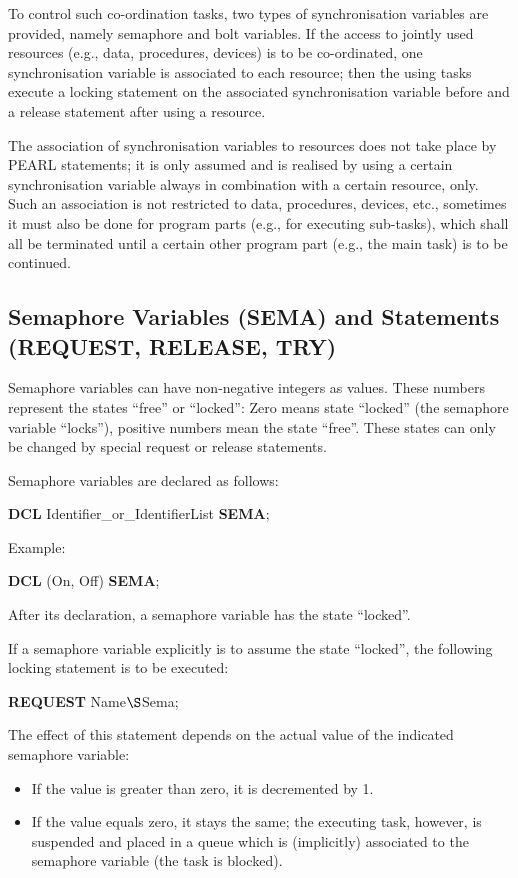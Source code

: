 To control such co-ordination tasks, two types of synchronisation
variables are provided, namely semaphore and bolt variables. If the
access to jointly used resources (e.g., data, procedures, devices) is to
be co-ordinated, one synchronisation variable is associated to each
resource; then the using tasks execute a locking statement on the
associated synchronisation variable before and a release statement
after using a resource.

The association of synchronisation variables to resources does not take
place by PEARL statements; it is only assumed and is realised by using a
certain synchronisation variable always in combination with a certain
resource, only. Such an association is not restricted to data,
procedures, devices, etc., sometimes it must also be done for program
parts (e.g., for executing sub-tasks), which shall all be
terminated until a certain other program part (e.g., the main task) is to be
continued.

\subsection{Semaphore Variables (SEMA) and Statements (REQUEST,
RELEASE, TRY)} %
\label{sec_semaphores}


Semaphore variables can have non-negative integers as values. These
numbers represent the states ``free'' or ``locked'': Zero means state
``locked'' (the semaphore variable ``locks''), positive numbers mean the
state ``free''.  These states can only be changed by special request or
release statements.

Semaphore variables are declared as follows:

{\bf DCL} Identifier\_or\_IdentifierList {\bf SEMA};

Example:

{\bf DCL} (On, Off) {\bf SEMA};

After its declaration, a semaphore variable has the state ``locked''.

If a semaphore variable explicitly is to assume the state ``locked'',
the following locking statement is to be executed:

{\bf REQUEST} Name$\S $Sema;

The effect of this statement depends on the actual value of the
indicated semaphore variable:
\begin{itemize}
\item If the value is greater than zero, it is decremented by 1.
\item If the value equals zero, it stays the same; the executing task,
however, is suspended and placed in a queue which is (implicitly)
associated to the semaphore variable (the task is blocked).
\end{itemize}

